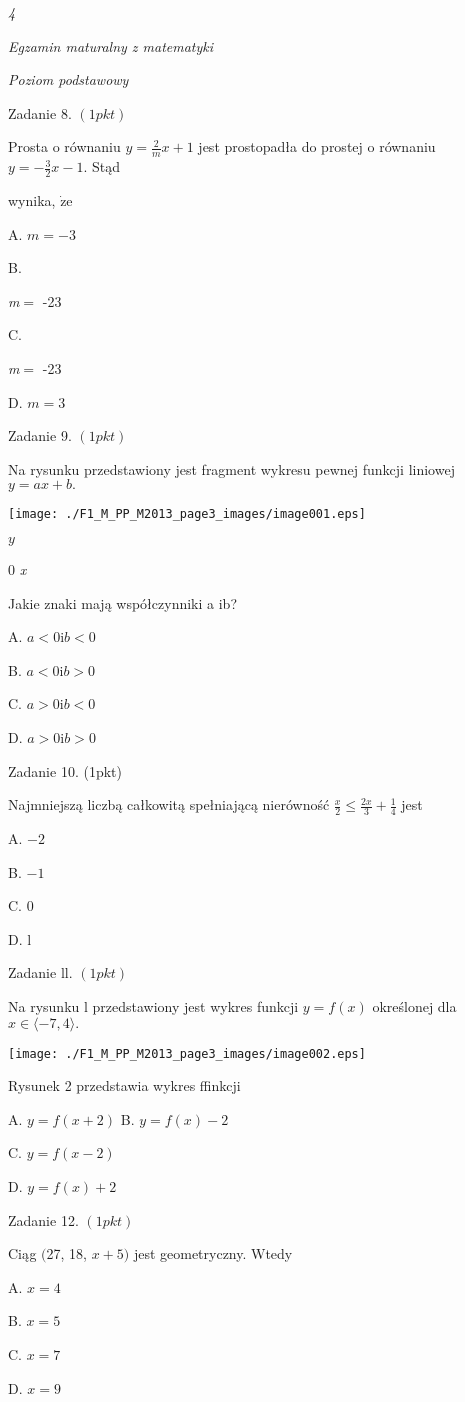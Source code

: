 \documentclass[a4paper,12pt]{article}
\begin{document}
{\it 4}

{\it Egzamin maturalny z matematyki}

{\it Poziom podstawowy}

Zadanie 8. $(1pkt)$

Prosta o równaniu $y=\displaystyle \frac{2}{m}x+1$ jest prostopadła do prostej o równaniu $y=-\displaystyle \frac{3}{2}x-1$. Stąd

wynika, $\dot{\mathrm{z}}\mathrm{e}$

A. $m=-3$

B.

{\it m}$=$ -23

C.

{\it m}$=$ -23

D. $m=3$

Zadanie 9. $(1pkt)$

Na rysunku przedstawiony jest fragment wykresu pewnej funkcji liniowej $y=ax+b.$
\begin{center}
\texttt{[image: ./F1\_M\_PP\_M2013\_page3\_images/image001.eps]}
\end{center}
$y$

0  {\it x}

Jakie znaki mają współczynniki a ib?

A. $a<0 \mathrm{i}b<0$

B. $a<0 \mathrm{i}b>0$

C. $a>0 \mathrm{i}b<0$

D. $a>0\mathrm{i}b>0$

Zadanie 10. (1pkt)

Najmniejszą liczbą całkowitą spełniającą nierówność $\displaystyle \frac{x}{2}\leq\frac{2x}{3}+\frac{1}{4}$ jest

A. $-2$

B. $-1$

C. 0

D. l

Zadanie ll. $(1pkt)$

Na rysunku l przedstawiony jest wykres funkcji $y=f(x)$ określonej dla $x\in\langle-7,4\rangle.$
\begin{center}
\texttt{[image: ./F1\_M\_PP\_M2013\_page3\_images/image002.eps]}
\end{center}
Rysunek 2 przedstawia wykres ffinkcji

A. $y=f(x+2)$ B. $y=f(x)-2$

C. $y=f(x-2)$

D. $y=f(x)+2$

Zadanie 12. $(1pkt)$

Ciąg $($27, 18, $x+5)$ jest geometryczny. Wtedy

A. $x=4$

B. $x=5$

C. $x=7$

D. $x=9$
\end{document}
